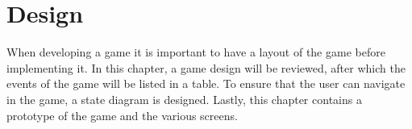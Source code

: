 \chapter{Design}\label{chapter:design}
When developing a game it is important to have a layout of the game before implementing it.
In this chapter, a game design will be reviewed, after which the events of the game will be listed in a table.
To ensure that the user can navigate in the game, a state diagram is designed.
Lastly, this chapter contains a prototype of the game and the various screens. 


